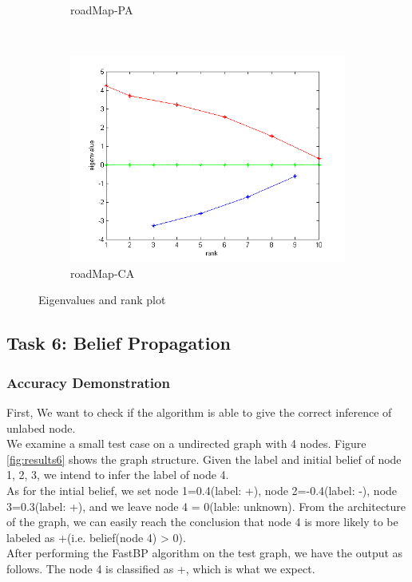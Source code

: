 \begin{figure}
\begin{subfigure}[htbp]{0.6\textwidth}
            \caption{roadMap-PA}
            \label{fig:ei-pa}
    \end{subfigure}
    ~ %
    \begin{subfigure}[htbp]{0.6\textwidth}
            \includegraphics[width=\textwidth]{FIG/ei-ca.png}
            \caption{roadMap-CA}
            \label{fig:ei-ca.png}
    \end{subfigure}
    \caption{Eigenvalues and rank plot}
        \label{fig:results5-2}
\end{figure} 


\subsection{Task 6: Belief Propagation}
\subsubsection{Accuracy Demonstration}
First, We want to check if the algorithm is able to give the correct inference of unlabed node. \\
We examine a small test case on a undirected graph with 4 nodes. Figure \ref{fig:results6} shows the graph structure. Given the label and initial belief of node 1, 2, 3, we intend to infer the label of node 4. \\
As for the intial belief, we set node 1=0.4(label: +), node 2=-0.4(label: -), node 3=0.3(label: +), and we leave node 4 = 0(lable: unknown). From the architecture of the graph, we can easily reach the conclusion that node 4 is more likely to be labeled as +(i.e. belief(node 4) > 0).\\
After performing the FastBP algorithm on the test graph, we have the output as follows. The node 4 is classified as +, which is what we expect.

